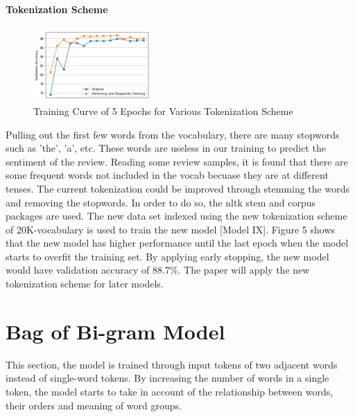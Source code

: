 \documentclass[10pt]{article}
\begin{document}
\paragraph{Tokenization Scheme}
\begin{figure} 

   \includegraphics[width=0.4\textwidth,right]{plot5}
   \caption{Training Curve of 5 Epochs for Various Tokenization Scheme}

\end{figure} 
Pulling out the first few words from the vocabulary, there are many stopwords such as 'the', 'a', etc. These words are useless in our training to predict the sentiment of the review. Reading some review samples, it is found that there are some frequent words not included in the vocab becuase they are at different tenses. The current tokenization could be improved through stemming the words and removing the stopwords. In order to do so, the nltk stem and corpus packages are used. The new data set indexed using the new tokenization scheme of 20K-vocabulary is used to train the new model [Model IX]. Figure 5 shows that the new model has higher performance until the last epoch when the model starts to overfit the training set. By applying early stopping, the new model would have validation accuracy of 88.7\%. The paper will apply the new tokenization scheme for later models.

 


\section{Bag of Bi-gram Model}
This section, the model is trained through input tokens of two adjacent words instead of single-word tokens. By increasing the number of words in a single token, the model starts to take in account of the relationship between words, their orders and meaning of word groups.
\end{document}
